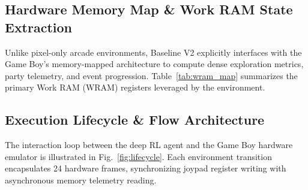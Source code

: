 \documentclass[conference]{IEEEtran}
\begin{document}
\subsection{Hardware Memory Map \& Work RAM State Extraction}
Unlike pixel-only arcade environments, Baseline V2 explicitly interfaces with the Game Boy's memory-mapped architecture to compute dense exploration metrics, party telemetry, and event progression. Table~\ref{tab:wram_map} summarizes the primary Work RAM (WRAM) registers leveraged by the environment.

\begin{table}[ht]
\centering
\caption{Game Boy Hardware Memory Map (WRAM) Registers Leveraged in Baseline V2 State and Reward Computation.}
\label{tab:wram_map}
\end{table}

\subsection{Execution Lifecycle \& Flow Architecture}
The interaction loop between the deep RL agent and the Game Boy hardware emulator is illustrated in Fig.~\ref{fig:lifecycle}. Each environment transition encapsulates 24 hardware frames, synchronizing joypad register writing with asynchronous memory telemetry reading.
\end{document}
